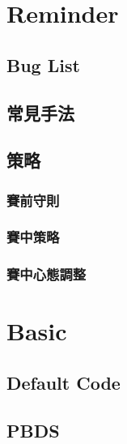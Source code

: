 \documentclass[twocolumn]{article}
\begin{document}
\setlength\parindent{0pt}

\tableofcontents

\pagestyle{fancy}
\fancyfoot{}
\fancyhead[R]{\thepage}

\newpage

\section{Reminder}

\subsection{Bug List}


\subsection{常見手法}


\subsection{策略}

\subsubsection{賽前守則}


\subsubsection{賽中策略}


\subsubsection{賽中心態調整}


\section{Basic}

\subsection{Default Code}


\subsection{PBDS}

\end{document}

